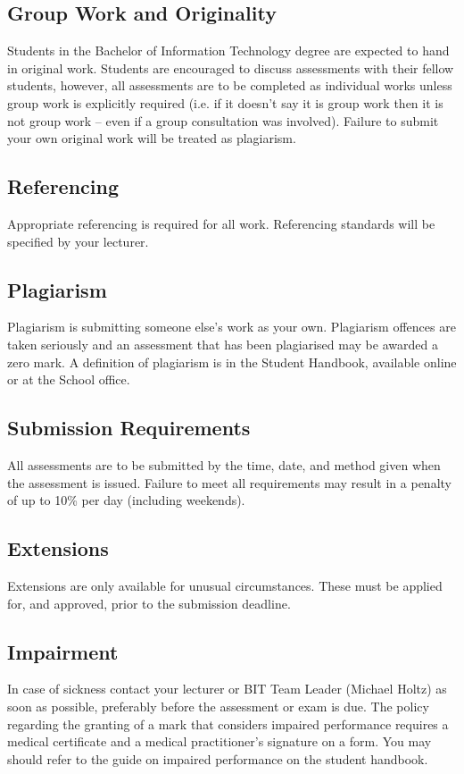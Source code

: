 \documentclass{article}
\begin{document}
\subsection*{Group Work and Originality}
Students in the Bachelor of Information Technology degree are expected to hand in original work. Students are encouraged to discuss assessments with their fellow students, however, all assessments are to be completed as individual works unless group work is explicitly required (i.e. if it doesn’t say it is group work then it is not group work – even if a group consultation was involved). Failure to submit your own original work will be treated as plagiarism.

\subsection*{Referencing}
Appropriate referencing is required for all work. Referencing standards will be specified by your lecturer.

\subsection*{Plagiarism}
Plagiarism is submitting someone else’s work as your own. Plagiarism offences are taken seriously and an assessment that has been plagiarised may be awarded a zero mark. A definition of plagiarism is in the Student Handbook, available online or at the School office.

\subsection*{Submission Requirements}
All assessments are to be submitted by the time, date, and method given when the assessment is issued. Failure to meet all requirements may result in a penalty of up to 10\% per day (including weekends).

\subsection*{Extensions}
Extensions are only available for unusual circumstances. These must be applied for, and approved, prior to the submission deadline.

\subsection*{Impairment}
In case of sickness contact your lecturer or BIT Team Leader (Michael Holtz) as soon as possible, preferably before the assessment or exam is due. The policy regarding the granting of a mark that considers impaired performance requires a medical certificate and a medical practitioner’s signature on a form. You may should refer to the guide on impaired performance on the student handbook.
\end{document}
